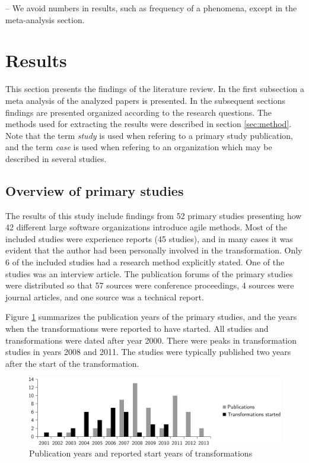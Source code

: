 \documentclass[preprint,authoryear,12pt]{elsarticle}
\begin{document}
-- We avoid numbers in results, such as frequency of a phenomena, except in the
   meta-analysis section.

\section{Results}
\label{sec:results}

This section presents the findings of the literature review. In the first
subsection a meta analysis of the analyzed papers is presented. In the
subsequent sections findings are presented organized according to the research
questions. The methods used for extracting the results were described in section
\ref{sec:method}. Note that the term \emph{study} is used when refering to a
primary study publication, and the term \emph{case} is used when refering to an
organization which may be described in several studies.

\subsection{Overview of primary studies}

The results of this study include findings from 52 primary studies presenting
how 42 different large software organizations introduce agile methods. Most of
the included studies were experience reports (45 studies), and in many cases it
was evident that the author had been personally involved in the transformation.
Only 6 of the included studies had a research method explicitly stated. One of
the studies was an interview article. The publication forums of the primary
studies were distributed so that 57 sources were conference proceedings, 4
sources were journal articles, and one source was a technical report.

Figure \ref{fig:transformation_time} summarizes the publication years of the
primary studies, and the years when the transformations were reported to have
started. All studies and transformations were dated after year 2000. There were
peaks in transformation studies in years 2008 and 2011. The studies were
typically published two years after the start of the transformation.

\begin{figure}[t]
  \begin{center}
    \includegraphics[width=1\textwidth]{graphics/transformation_time.pdf}
    \caption{Publication years and reported start years of transformations}
    \label{fig:transformation_time}
  \end{center}
\end{figure}
\end{document}
